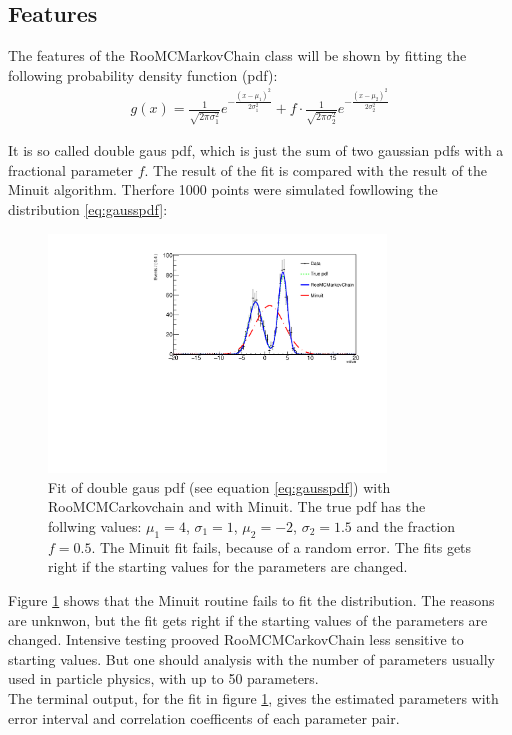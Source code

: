 \documentclass[english]{uzhpub}
\begin{document}
\subsection{Features} \label{sec:features}
 The features of the RooMCMarkovChain class will be shown by fitting the following probability density function (pdf):
\begin{align}
  g(x) = \frac{1}{\sqrt{2 \pi \sigma_1^2}} e^{- \frac{(x-\mu_1)^2}{2 \sigma_1^2}} + f \cdot  \frac{1}{\sqrt{2 \pi \sigma_2^2}} e^{- \frac{(x-\mu_2)^2}{2 \sigma_2^2}} \label{eq:gausspdf}
 \end{align}

It is so called double gaus pdf, which is just the sum of two gaussian pdfs with a fractional parameter $f$.
The result of the fit is compared with the result of the Minuit algorithm. Therfore 1000 points were simulated fowllowing the distribution \ref{eq:gausspdf}:

\begin{figure}[H]
  \centering
  \includegraphics[width=0.8\textwidth]{RooMCMC/twogausfit}
  \caption{Fit of double gaus pdf (see equation \ref{eq:gausspdf}) with RooMCMCarkovchain and with Minuit. The true pdf has the follwing values: $\mu_1 = 4$, $\sigma_1 = 1$, $\mu_2 = -2$, $\sigma_2 = 1.5$ and the fraction $f = 0.5$. The Minuit fit fails, because of a random error. The fits gets right if the starting values for the parameters are changed.}
  \label{fig:twogaus}
\end{figure}
Figure \ref{fig:twogaus} shows that the Minuit routine fails to fit the distribution. The reasons are unknwon, but the fit gets right if the starting values of the parameters are changed. Intensive testing prooved RooMCMCarkovChain less sensitive to starting values. But one should analysis with the number of parameters usually used in particle physics, with up to 50 parameters. \\
The terminal output, for the fit in figure \ref{fig:twogaus}, gives the estimated parameters with error interval and correlation coefficents of each parameter pair.
\end{document}
